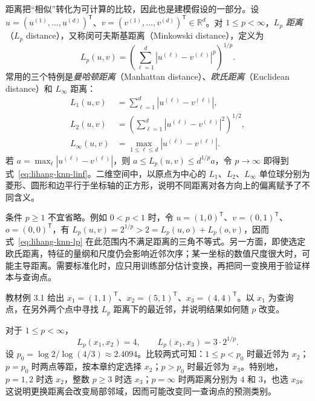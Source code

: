 距离把“相似”转化为可计算的比较，因此也是建模假设的一部分。设 $u=(u^{(1)},\ldots,u^{(d)})^\mathsf T$、$v=(v^{(1)},\ldots,v^{(d)})^\mathsf T\in\mathbb R^d$。对 $1\leq p<\infty$，\emph{$L_p$ 距离}（$L_p$ distance），又称闵可夫斯基距离（Minkowski distance），定义为
\begin{equation}
  L_p(u,v)=\left(\sum_{\ell=1}^{d}|u^{(\ell)}-v^{(\ell)}|^p\right)^{1/p}.
  \label{eq:lihang-knn-lp}
\end{equation}
常用的三个特例是\emph{曼哈顿距离}（Manhattan distance）、\emph{欧氏距离}（Euclidean distance）和 $L_\infty$ 距离：
\begin{align}
  L_1(u,v)&=\sum_{\ell=1}^{d}|u^{(\ell)}-v^{(\ell)}|,
  \label{eq:lihang-knn-l1}\\
  L_2(u,v)&=\left(\sum_{\ell=1}^{d}|u^{(\ell)}-v^{(\ell)}|^2\right)^{1/2},
  \label{eq:lihang-knn-l2}\\
  L_\infty(u,v)&=\max_{1\leq\ell\leq d}|u^{(\ell)}-v^{(\ell)}|.
  \label{eq:lihang-knn-linf}
\end{align}
若 $a=\max_\ell|u^{(\ell)}-v^{(\ell)}|$，则 $a\leq L_p(u,v)\leq d^{1/p}a$，令 $p\to\infty$ 即得到式~\eqref{eq:lihang-knn-linf}。二维空间中，以原点为中心的 $L_1$、$L_2$、$L_\infty$ 单位球分别为菱形、圆形和边平行于坐标轴的正方形，说明不同距离对各方向上的偏离赋予了不同含义。

条件 $p\geq1$ 不宜省略。例如 $0<p<1$ 时，令 $u=(1,0)^\mathsf T$、$v=(0,1)^\mathsf T$、$o=(0,0)^\mathsf T$，有 $L_p(u,v)=2^{1/p}>2=L_p(u,o)+L_p(o,v)$，因而式~\eqref{eq:lihang-knn-lp} 在此范围内不满足距离的三角不等式。另一方面，即使选定欧氏距离，特征的量纲和尺度仍会影响近邻次序；某一坐标的数值尺度很大时，可能主导距离。需要标准化时，应只用训练部分估计变换，再把同一变换用于验证样本与查询点。

\begin{example}
\label{ex:lihang-knn-distance-change}
教材例 3.1 给出 $x_1=(1,1)^\mathsf T$、$x_2=(5,1)^\mathsf T$、$x_3=(4,4)^\mathsf T$。以 $x_1$ 为查询点，在另外两个点中寻找 $L_p$ 距离下的最近邻，并说明结果如何随 $p$ 改变。
\end{example}
\begin{solve}
对于 $1\leq p<\infty$，
\[
  L_p(x_1,x_2)=4,\qquad L_p(x_1,x_3)=3\cdot2^{1/p}.
\]
设 $p_0=\log 2/\log(4/3)\approx2.4094$。比较两式可知：$1\leq p<p_0$ 时最近邻为 $x_2$；$p=p_0$ 时两点等距，按本章约定选择 $x_2$；$p>p_0$ 时最近邻为 $x_3$。特别地，$p=1,2$ 时选 $x_2$，整数 $p\geq3$ 时选 $x_3$；$p=\infty$ 时两距离分别为 $4$ 和 $3$，也选 $x_3$。这说明更换距离会改变局部邻域，因而可能改变同一查询点的预测类别。
\end{solve}

